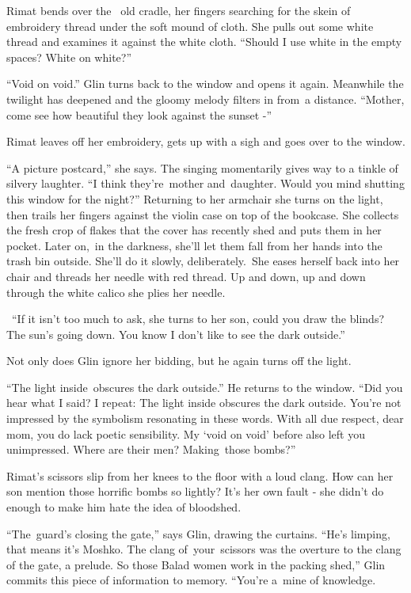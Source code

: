 \documentclass[letterpaper]{article}
\begin{document}
{Rimat bends over the \ old cradle, her fingers searching for the
}skein {of embroidery thread under the soft mound of cloth. She pulls
}out some {white thread and examines it against the white cloth.
``Should I use white in the }empty{ spaces? White on white?''}

{{}``Void on void.'' Glin
}turns{ back to the window and opens it again. Meanwhile the twilight
has deepened and the gloomy melody filters in from~a distance. ``Mother, come see how beautiful they look against the
sunset -''}

{Rimat leaves off her embroidery, gets up with a sigh and goes over to
the window. }

{{}``A picture postcard,'' she says. The singing momentarily gives way
to a tinkle of silvery laughter. ``I think they're~mother and~daughter}. Would you mind shutting this window for the
night?{{}'' }Returning{
}{to her armchair she turns on the light, }then trails her fingers
{against the violin case on }top
of{ }{the bookcase. She
collects the fresh crop of flakes that the cover has recently shed and
}puts{ them in her pocket. Later on},~in the darkness,
{she'll let them fall from her hands into the trash bin
}outside{. She'll do it slowly, deliberately.~She eases herself back
into her chair and threads her needle with red thread. Up and down, up and down }through the white calico she
{plies her needle. \ }

{\ {}``If it isn't}{
}{too much to ask,{\textquotedbl} she }turns to her son,
{{\textquotedbl}could you }draw the blinds? The sun's going
down.{ You know I don't like to see the dark}
{outside.''}

{Not only does Glin
}ignore{ her bidding, but he again turns off the light. }

{{}``The light inside~o}bscures
{the dark outside.'' He returns to the window. ``Did you hear what I
said? I repeat}{:}{ The light
inside }obscures{ the dark outside. You're not impressed by the
symbolism resonating in these words. With all due respect, }dear mom,
{you do lack poetic sensibility. My `void on void' }before also left
you unimpressed.{ Where are their men?
}Making{~those bombs?''}

Rimat's scissors slip from her knees to the floor with a loud clang. How can her son mention those horrific bombs so
lightly? It's her own fault - she didn't do enough to make him hate the idea of bloodshed.

{}``The~guard's closing the gate,'' says Glin, drawing the curtains. ``He's limping, that means it's Moshko. The clang
of~your~scissors was the overture to the clang of the gate, a prelude. So those Balad women work in the packing shed,''
Glin commits this piece of information to memory. ``You're a~mine of knowledge.{\textquotedbl}
\end{document}
